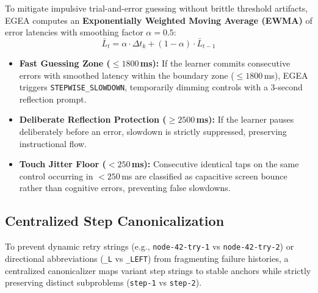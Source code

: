\documentclass[conference]{IEEEtran}
\begin{document}
To mitigate impulsive trial-and-error guessing without brittle threshold artifacts, EGEA computes an \textbf{Exponentially Weighted Moving Average (EWMA)} of error latencies with smoothing factor $\alpha = 0.5$:
\begin{equation}
\bar{L}_t = \alpha \cdot \Delta t_k + (1 - \alpha) \cdot \bar{L}_{t-1}
\end{equation}
\begin{itemize}
    \item \textbf{Fast Guessing Zone ($\le 1800$\,ms):} If the learner commits consecutive errors with smoothed latency within the boundary zone ($\le 1800$\,ms), EGEA triggers \texttt{STEPWISE\_SLOWDOWN}, temporarily dimming controls with a 3-second reflection prompt.
    \item \textbf{Deliberate Reflection Protection ($\ge 2500$\,ms):} If the learner pauses deliberately before an error, slowdown is strictly suppressed, preserving instructional flow.
    \item \textbf{Touch Jitter Floor ($< 250$\,ms):} Consecutive identical taps on the same control occurring in $< 250$\,ms are classified as capacitive screen bounce rather than cognitive errors, preventing false slowdowns.
\end{itemize}

\subsection{Centralized Step Canonicalization}
To prevent dynamic retry strings (e.g., \texttt{node-42-try-1} vs \texttt{node-42-try-2}) or directional abbreviations (\texttt{\_L} vs \texttt{\_LEFT}) from fragmenting failure histories, a centralized canonicalizer maps variant step strings to stable anchors while strictly preserving distinct subproblems (\texttt{step-1} vs \texttt{step-2}).
\end{document}
